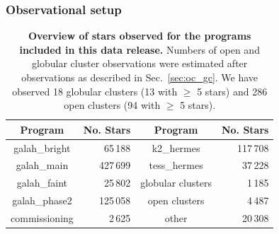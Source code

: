 \documentclass[
  journal=pasa,
  manuscript=research-paper, %
  year=2023,
  volume=37
]{cup-journal}
\begin{document}
\subsubsection{Observational setup}

\begin{table}
\centering
 \caption{\textbf{Overview of stars observed for the programs included in this data release.} Numbers of open and globular cluster observations were estimated after observations as described in Sec.~\ref{sec:oc_gc}. We have observed 18 globular clusters (13 with $\geq$ 5 stars) and 286 open clusters (94 with $\geq$ 5 stars).}
\label{tab:field_ids}
\begin{tabular}{crcr}
\hline \hline
Program & No. Stars & Program & No. Stars \\
\hline
galah\_bright & 65\,188 & 
k2\_hermes & 117\,708\\
galah\_main & 427\,699 & 
tess\_hermes & 37\,228\\
galah\_faint & 25\,802 & 
globular clusters & 1\,185\\
galah\_phase2 & 125\,058 & 
open clusters & 4\,487\\
commissioning & 2\,625 & 
other & 20\,308\\
  \hline
 \end{tabular}
\end{table}
\end{document}

